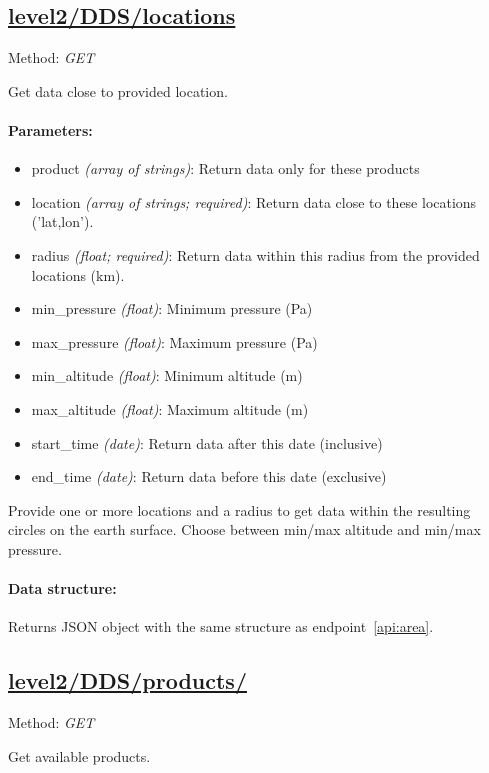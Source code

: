 \subsection{\url{level2/DDS/locations}}
Method: \emph{GET}

Get data close to provided location.

\paragraph{Parameters:}
\begin{itemize}
    \item product \emph{(array of strings)}: Return data only for these
        products
    \item location \emph{(array of strings; required)}: Return data close to
        these locations ('lat,lon').
    \item radius \emph{(float; required)}: Return data within this radius from
        the provided locations (km).
    \item min\_pressure \emph{(float)}: Minimum pressure (Pa)
    \item max\_pressure \emph{(float)}: Maximum pressure (Pa)
    \item min\_altitude \emph{(float)}: Minimum altitude (m)
    \item max\_altitude \emph{(float)}: Maximum altitude (m)
    \item start\_time \emph{(date)}: Return data after this date (inclusive)
    \item end\_time \emph{(date)}: Return data before this date (exclusive)
\end{itemize}

Provide one or more locations and a radius to get data within the resulting
circles on the earth surface. Choose between min/max altitude and min/max
pressure.

\paragraph{Data structure:}
Returns JSON object with the same structure as endpoint~\ref{api:area}.


\subsection{\url{level2/DDS/products/}}
\label{api:products}
Method: \emph{GET}

Get available products.

